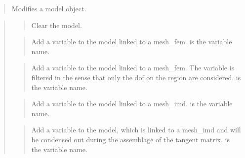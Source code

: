 \documentclass[a4paper,11pt,english]{sphinxmanual}
\begin{document}
\begin{quote}

Modifies a model object.
\end{quote}

\begin{quote}

\begin{quote}

Clear the model.
\end{quote}

\begin{quote}

Add a variable to the model linked to a mesh\_fem.  is the variable
name.
\end{quote}

\begin{quote}

Add a variable to the model linked to a mesh\_fem. The variable is filtered
in the sense that only the dof on the region are considered.
 is the variable name.
\end{quote}

\begin{quote}

Add a variable to the model linked to a mesh\_imd.  is the variable
name.
\end{quote}

\begin{quote}

Add a variable to the model, which is linked to a mesh\_imd and will be
condensed out during the assemblage of the tangent matrix.  is
the variable name.
\end{quote}

\begin{quote}


\end{quote}
\end{quote}
\end{document}
